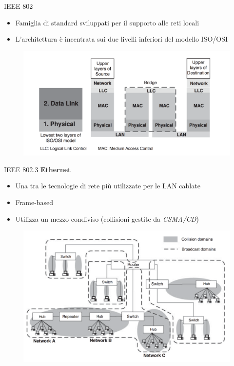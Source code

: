 
\begin{frame}{IEEE 802}
	\begin{itemize}
		\item Famiglia di standard sviluppati per il supporto alle reti locali
		\item L'architettura è incentrata sui due livelli inferiori del modello ISO/OSI
	\end{itemize}
	\begin{figure}[h] 
		\includegraphics[scale=0.3,cfbox=blue_slides 1pt 0pt]{imgs/arch_ieee802.png}
	\end{figure}
\end{frame}

\begin{frame}{IEEE 802.3}
	\textbf{Ethernet}
	\begin{itemize}
		\item Una tra le tecnologie di rete più utilizzate per le LAN cablate
		\item Frame-based
		\item Utilizza un mezzo condiviso (collisioni gestite da \textit{CSMA/CD})
	\end{itemize}
	\begin{figure}[h] 
		\includegraphics[scale=0.23,cfbox=blue_slides 1pt 0pt]{imgs/lan.png}
	\end{figure}
\end{frame}

